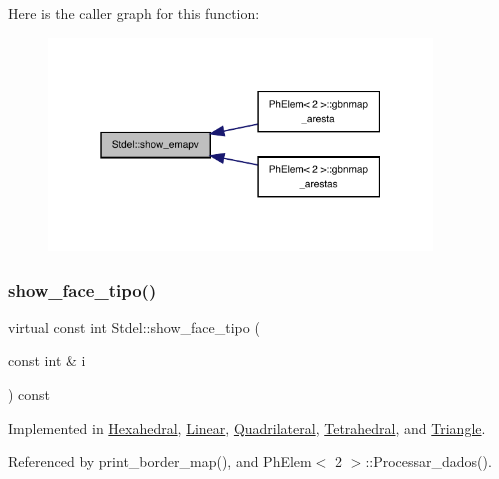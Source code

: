 Here is the caller graph for this function\+:
\nopagebreak
\begin{figure}[H]
\begin{center}
\leavevmode
\includegraphics[width=289pt]{classStdel_ad474ffc52b051ae8317b3fdb583c4c98_icgraph}
\end{center}
\end{figure}
\mbox{\label{classStdel_ae76b0893dabd93ae9f86a9ed445852ba}} 
\subsubsection{\texorpdfstring{show\+\_\+face\+\_\+tipo()}{show\_face\_tipo()}}
{\footnotesize\ttfamily virtual const int Stdel\+::show\+\_\+face\+\_\+tipo (\begin{DoxyParamCaption}\item[{const int \&}]{i }\end{DoxyParamCaption}) const\hspace{0.3cm}{\ttfamily [pure virtual]}}



Implemented in \hyperlink{classHexahedral_a178069c54d64ffb98dba409cd5080ede}{Hexahedral}, \hyperlink{classLinear_a696305db90ca619b2bbbb1fbbb360e8e}{Linear}, \hyperlink{classQuadrilateral_a00c61211ab8aa2447d651f6dce2db301}{Quadrilateral}, \hyperlink{classTetrahedral_a22f9442de50c6c994019935bb8011464}{Tetrahedral}, and \hyperlink{classTriangle_a7f711afd182aa8bae52c8acfa4ce3690}{Triangle}.



Referenced by print\+\_\+border\+\_\+map(), and Ph\+Elem$<$ 2 $>$\+::\+Processar\+\_\+dados().

